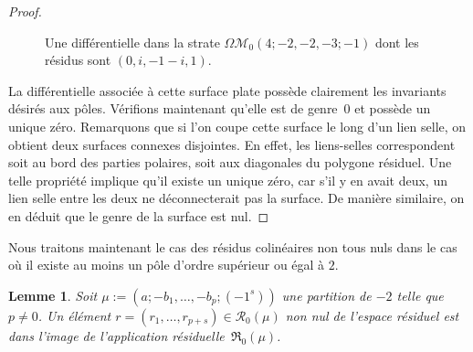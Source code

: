 \documentclass[JEP,XML,SOM,Unicode,francais,NoFloatCountersInSection,published]{cedram}
\let\mathcal\mathscr
\newcommand{\appres}[1][g]{\mathfrak{R}_{#1}}
\newcommand{\espres}[1][g]{\mathcal{R}_{#1}}
\newcommand{\omoduli}[1][g]{{\Omega\mathcal M}_{\!#1}}
\newtheorem{lem}[thm]{Lemme}
\theoremstyle{definition}
\begin{document}
\begin{proof}
\begin{figure}[htb]
\caption{Une différentielle dans la strate $\omoduli[0](4;-2,-2,-3;-1)$ dont les résidus sont $(0,i,-1-i,1)$.} \label{fig:casgeneralgenrezero}
\end{figure}

La différentielle associée à cette surface plate possède clairement les invariants désirés aux pôles. Vérifions maintenant qu'elle est de genre~$0$ et possède un unique zéro. Remarquons que si l'on coupe cette surface le long d'un lien selle, on obtient deux surfaces connexes disjointes. En effet, les liens-selles correspondent soit au bord des parties polaires, soit aux diagonales du polygone résiduel. Une telle propriété implique qu'il existe un unique zéro, car s'il y en avait deux, un lien selle entre les deux ne déconnecterait pas la surface. De manière similaire, on en déduit que le genre de la surface est nul.
\end{proof}

Nous traitons maintenant le cas des résidus colinéaires non tous nuls dans le cas où il existe au moins un pôle d'ordre supérieur ou égal à $2$.
\begin{lem}\label{lem:gzerogen2}
Soit $\mu:=(a;-b_{1},\dots,-b_{p};(-1^{s}))$ une partition de $-2$ telle que $p\neq0$. Un élément $r=(r_{1}, \dots , r_{p+s})\in\espres[0](\mu)$
non nul de l’espace résiduel est dans l’image de l'application résiduelle~$\appres[0](\mu)$.
\end{lem}
\end{document}
